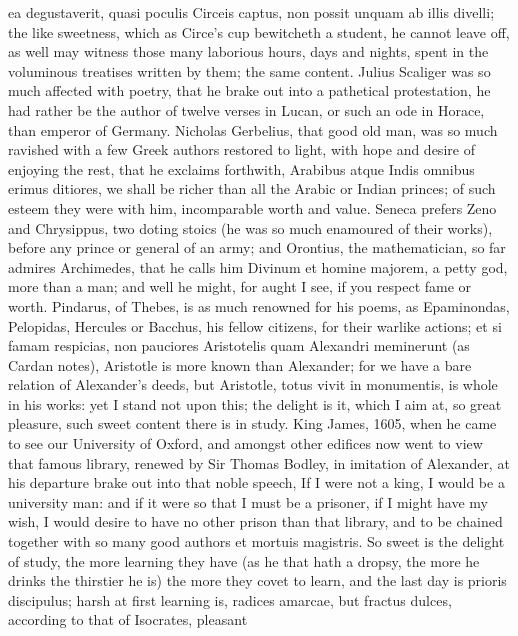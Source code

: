 {ea degustaverit, quasi poculis Circeis captus, non possit unquam ab
illis divelli; the like sweetness, which as Circe's cup bewitcheth a
student, he cannot leave off, as well may witness those many laborious
hours, days and nights, spent in the voluminous treatises written by
them; the same content. Julius Scaliger was so much affected with
poetry, that he brake out into a pathetical protestation, he had rather
be the author of twelve verses in Lucan, or such an ode in
Horace, than emperor of Germany. Nicholas Gerbelius, that
good old man, was so much ravished with a few Greek authors restored to
light, with hope and desire of enjoying the rest, that he exclaims
forthwith, Arabibus atque Indis omnibus erimus ditiores, we shall be
richer than all the Arabic or Indian princes; of such esteem they
were with him, incomparable worth and value. Seneca prefers Zeno and
Chrysippus, two doting stoics (he was so much enamoured of their
works), before any prince or general of an army; and Orontius, the
mathematician, so far admires Archimedes, that he calls him Divinum et
homine majorem, a petty god, more than a man; and well he might, for
aught I see, if you respect fame or worth. Pindarus, of Thebes, is as
much renowned for his poems, as Epaminondas, Pelopidas, Hercules or
Bacchus, his fellow citizens, for their warlike actions; et si famam
respicias, non pauciores Aristotelis quam Alexandri meminerunt (as
Cardan notes), Aristotle is more known than Alexander; for we have a
bare relation of Alexander's deeds, but Aristotle, totus vivit in
monumentis, is whole in his works: yet I stand not upon this; the
delight is it, which I aim at, so great pleasure, such sweet content
there is in study. King James, 1605, when he came to see our
University of Oxford, and amongst other edifices now went to view that
famous library, renewed by Sir Thomas Bodley, in imitation of
Alexander, at his departure brake out into that noble speech, If I were
not a king, I would be a university man:  and if it were so that
I must be a prisoner, if I might have my wish, I would desire to have
no other prison than that library, and to be chained together with so
many good authors et mortuis magistris. So sweet is the delight of
study, the more learning they have (as he that hath a dropsy, the more
he drinks the thirstier he is) the more they covet to learn, and the
last day is prioris discipulus; harsh at first learning is, radices
amarcae, but fractus dulces, according to that of Isocrates, pleasant
}
